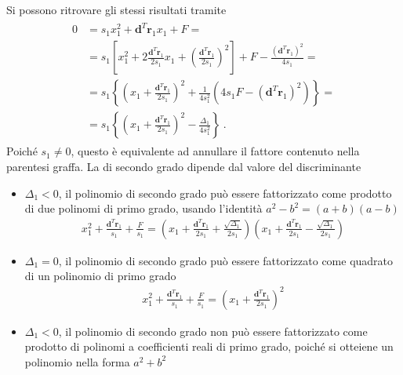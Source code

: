 \documentclass[letterpaper,10pt,italian]{jupyterBook}
\begin{document}
\sphinxAtStartPar
Si possono ritrovare gli stessi risultati tramite 
\begin{equation*}
\begin{split}\begin{aligned}
  0
  & = s_1 x_1^2 + \mathbf{d}^T \mathbf{r}_1 x_1 + F = \\
  & = s_1 \left[ x_1^2 + 2 \frac{\mathbf{d}^T \mathbf{r}_1}{2 s_1} x_1 + \left( \frac{\mathbf{d}^T \mathbf{r}_1}{2 s_1} \right)^2 \right] + F - \frac{\left(\mathbf{d}^T \mathbf{r}_1\right)^2}{4 s_1} = \\
  & = s_1 \left\{ \left( x_1 + \frac{\mathbf{d}^T \mathbf{r}_1}{2 s_1} \right)^2 + \frac{1}{4 s_1^2} \left( 4 s_1 F - \left(\mathbf{d}^T \mathbf{r}_1\right)^2 \right) \right\} = \\
  & = s_1 \left\{ \left( x_1 + \frac{\mathbf{d}^T \mathbf{r}_1}{2 s_1} \right)^2 - \frac{\Delta_1}{4 s_1^2} \right\} \ .
\end{aligned}\end{split}
\end{equation*}
\sphinxAtStartPar
Poiché \(s_1 \ne 0\), questo è equivalente ad annullare il fattore contenuto nella parentesi graffa. La  di secondo grado dipende dal valore del discriminante
\begin{itemize}
\item {} 
\sphinxAtStartPar
\(\Delta_1 < 0\), il polinomio di secondo grado può essere fattorizzato come prodotto di due polinomi di primo grado, usando l’identità \(a^2 - b^2 = (a+b)(a-b)\)
\begin{equation*}
\begin{split}x_1^2 + \frac{\mathbf{d}^T \mathbf{r}_1}{s_1} + \frac{F}{s_1} = \left( x_1 + \frac{\mathbf{d}^T \mathbf{r}_1}{2 s_1} + \frac{\sqrt{\Delta_1}}{2 s_1} \right) \left( x_1 + \frac{\mathbf{d}^T \mathbf{r}_1}{2 s_1} - \frac{\sqrt{\Delta_1}}{2 s_1} \right) \end{split}
\end{equation*}
\item {} 
\sphinxAtStartPar
\(\Delta_1 = 0\), il polinomio di secondo grado può essere fattorizzato come quadrato di un polinomio di primo grado
\begin{equation*}
\begin{split}x_1^2 + \frac{\mathbf{d}^T \mathbf{r}_1}{s_1} + \frac{F}{s_1} = \left( x_1 + \frac{\mathbf{d}^T \mathbf{r}_1}{2 s_1} \right)^2 \end{split}
\end{equation*}
\item {} 
\sphinxAtStartPar
\(\Delta_1 < 0\), il polinomio di secondo grado non può essere fattorizzato come prodotto di polinomi a coefficienti reali di primo grado, poiché si otteiene un polinomio nella forma \(a^2 + b^2\)

\end{itemize}
\end{document}
